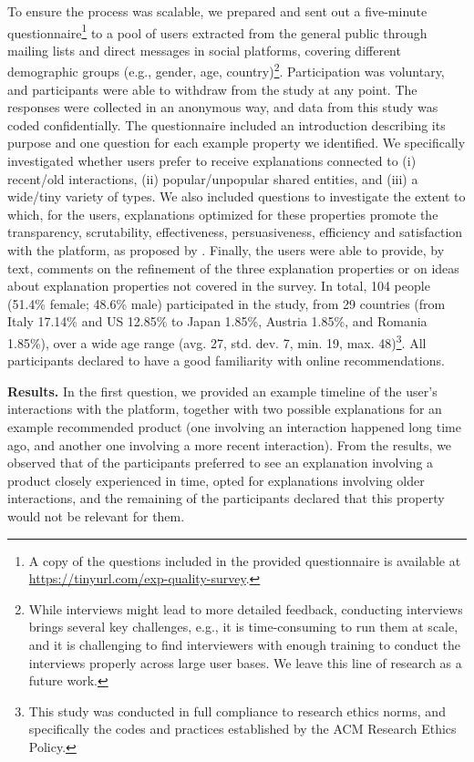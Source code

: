 \documentclass[sigconf]{acmart}
\begin{document}
\vspace{1mm}   
To ensure the process was scalable, we prepared and sent out a five-minute questionnaire\footnote{A copy of the questions included in the provided questionnaire is available at \url{https://tinyurl.com/exp-quality-survey}.} to a pool of users {\color{black} extracted from the general public through mailing lists and direct messages in social platforms}, covering different demographic groups (e.g., gender, age, country)\footnote{While interviews might lead to more detailed feedback, conducting interviews brings several key challenges, e.g., it is time-consuming to run them at scale, and it is challenging to find interviewers with enough training to conduct the interviews properly across large user bases. We leave this line of research as a future work.}.  
Participation was voluntary, and participants were able to withdraw from the study at any point. 
The responses were collected in an anonymous way, and data from this study was coded confidentially. 
The questionnaire included an introduction describing its purpose and one question for each example property we identified.
We specifically investigated whether users prefer to receive explanations connected to (i) recent/old interactions, (ii) popular/unpopular shared entities, and (iii) a wide/tiny variety of types.
We also included questions to investigate the extent to which, for the users, explanations optimized for these properties promote the transparency, scrutability, effectiveness, persuasiveness, efficiency and satisfaction with the platform, as proposed by \cite{Tintarev2007}. Finally, the users were able to provide, by text, comments on the refinement of the three explanation properties or on ideas about explanation properties not covered in the survey. In total, 104 people (51.4\% female; 48.6\% male) participated in the study, from 29 countries (from Italy 17.14\% and US 12.85\% to Japan 1.85\%, Austria 1.85\%, and Romania 1.85\%), over a wide age range (avg. 27, std. dev. 7, min. 19, max. 48)\footnote{This study was conducted in full compliance to research ethics norms, and specifically the codes and practices established by the ACM Research Ethics Policy.}. 
All participants declared to have a good familiarity with online recommendations.

\vspace{1mm}\noindent\textbf{Results.} 
In the first question, we provided an example timeline of the user's interactions with the platform, together with two possible explanations for an example recommended product (one involving an interaction happened long time ago, and another one involving a more recent interaction). 
From the results, we observed that  of the participants preferred to see an explanation involving a product closely experienced in time,  opted for explanations involving older interactions, and the remaining  of the participants declared that this property would not be relevant for them.
\end{document}
